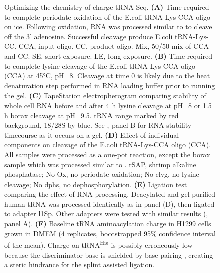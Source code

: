 \documentclass[9pt,lineno]{elife}
\begin{document}
\begin{figure}[ht!]
\centering
{}
\caption{
Optimizing the chemistry of charge tRNA-Seq.
\textbf{(A)} Time required to complete periodate oxidation of the E.coli tRNA-Lys-CCA oligo on ice.
Following oxidation, RNA was processed similar to \cite{Evans2017-st} to cleave off the 3’ adenosine.
Successful cleavage produce E.coli tRNA-Lys-CC.
CCA, input oligo.
CC, product oligo.
Mix, 50/50 mix of CCA and CC.
SE, short exposure.
LE, long exposure.
\textbf{(B)} Time required to complete lysine cleavage of the E.coli tRNA-Lys-CCA oligo (CCA) at 45°C, pH=8.
Cleavage at time 0 is likely due to the heat denaturation step performed in RNA loading buffer prior to running the gel.
\textbf{(C)} TapeStation electropherogram comparing stability of whole cell RNA before and after 4 h lysine cleavage at pH=8 or 1.5 h borax cleavage at pH=9.5.
tRNA range marked by red background, 18/28S by blue.
See , panel B for RNA stability timecourse as it occurs on a gel.
\textbf{(D)} Effect of individual components on cleavage of the E.coli tRNA-Lys-CCA oligo (CCA).
All samples were processed as a one-pot reaction, except the borax sample which was processed similar to \cite{Evans2017-st}.
rSAP, shrimp alkaline phosphatase; No Ox, no periodate oxidation; No clvg, no lysine cleavage; No dphs, no dephosphorylation.
\textbf{(E)} Ligation test comparing the effect of RNA processing.
Deacylated and gel purified human tRNA was processed identically as in panel (D), then ligated to adapter l1Sp.
Other adapters were tested with similar results (, panel A).
\textbf{(F)} Baseline tRNA aminoacylation charge in H1299 cells grown in DMEM (4 replicates, bootstrapped 95\% confidence interval of the mean).
Charge on tRNA\textsuperscript{His} is possibly erroneously low because the discriminator base is shielded by base pairing \citep{Heinemann2012-hq}, creating a steric hindrance for the splint assisted ligation.
}
\label{fig:Fig2}


\end{figure}
\end{document}
